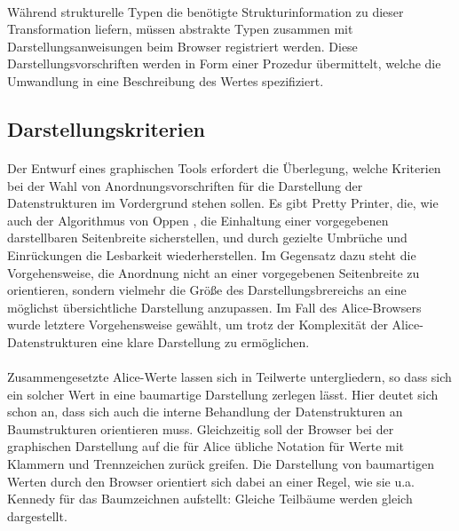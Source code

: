 \documentclass[12pt,a4paper]{article}
\begin{document}
\paragraph{}

W\"ahrend strukturelle Typen die ben\"otigte Strukturinformation 
zu dieser Transformation liefern, m\"ussen abstrakte Typen 
zusammen mit Darstellungsanweisungen beim Browser registriert 
werden. Diese Darstellungsvorschriften werden in Form einer 
Prozedur \"ubermittelt, welche die Umwandlung in eine 
Beschreibung des Wertes spezifiziert.  

\subsection{Darstellungskriterien}

\paragraph{}

Der Entwurf eines graphischen Tools erfordert die \"Uberlegung, 
welche Kriterien bei der Wahl von Anordnungsvorschriften f\"ur 
die Darstellung der Datenstrukturen im Vordergrund stehen sollen. 
Es gibt Pretty Printer, die, wie auch der 
Algorithmus von Oppen \cite{op:pr}, die Einhaltung einer vorgegebenen 
darstellbaren Seitenbreite sicherstellen, und durch gezielte 
Umbr\"uche und Einr\"uckungen die Lesbarkeit wiederherstellen. Im 
Gegensatz dazu steht die Vorgehensweise, die Anordnung nicht 
an einer vorgegebenen Seitenbreite zu orientieren, sondern 
vielmehr die Gr\"o\ss e des Darstellungsbrereichs an eine m\"oglichst 
\"ubersichtliche Darstellung anzupassen. 
Im Fall des Alice-Browsers wurde letztere Vorgehensweise gew\"ahlt, 
um trotz der Komplexit\"at der Alice-Datenstrukturen 
eine klare Darstellung zu erm\"oglichen.

\paragraph{}

Zusammengesetzte Alice-Werte lassen sich in Teilwerte untergliedern, 
so dass sich ein solcher Wert 
in eine baumartige Darstellung zerlegen l\"asst.
Hier deutet sich schon an, 
dass sich auch die interne Behandlung der Datenstrukturen 
an Baumstrukturen orientieren muss. Gleichzeitig soll der Browser 
bei der graphischen Darstellung auf 
die f\"ur Alice \"ubliche Notation f\"ur 
Werte mit Klammern und Trennzeichen 
zur\"uck greifen.    
Die Darstellung von baumartigen Werten durch 
den Browser orientiert sich dabei 
an einer Regel, wie sie u.a. Kennedy \cite{ke:dr} f\"ur 
das Baumzeichnen aufstellt: Gleiche Teilb\"aume werden 
gleich dargestellt. 
\end{document}
